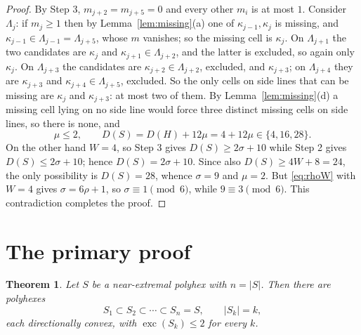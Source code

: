 \documentclass[11pt]{article}
\theoremstyle{plain}
\newtheorem{theorem}{Theorem}[section]
\theoremstyle{definition}
\theoremstyle{remark}
\DeclareMathOperator{\exc}{exc}
\begin{document}
\begin{proof}
By Step 3, \(m_{j+2}=m_{j+5}=0\) and every other \(m_{i}\) is at most \(1\). Consider
\(\Lambda_{j}\): if \(m_{j}\ge1\) then by Lemma~\ref{lem:missing}(a) one of
\(\kappa_{j-1},\kappa_{j}\) is missing, and \(\kappa_{j-1}\in\Lambda_{j-1}=\Lambda_{j+5}\),
whose \(m\) vanishes; so the missing cell is \(\kappa_{j}\). On \(\Lambda_{j+1}\) the two
candidates are \(\kappa_{j}\) and \(\kappa_{j+1}\in\Lambda_{j+2}\), and the latter is
excluded, so again only \(\kappa_{j}\). On \(\Lambda_{j+3}\) the candidates are
\(\kappa_{j+2}\in\Lambda_{j+2}\), excluded, and \(\kappa_{j+3}\); on \(\Lambda_{j+4}\) they
are \(\kappa_{j+3}\) and \(\kappa_{j+4}\in\Lambda_{j+5}\), excluded. So the only cells on
side lines that can be missing are \(\kappa_{j}\) and \(\kappa_{j+3}\): at most two of
them. By Lemma~\ref{lem:missing}(d) a missing cell lying on no side line would force three
distinct missing cells on side lines, so there is none, and
\[
   \mu\le2,\qquad D(S)=D(H)+12\mu=4+12\mu\in\{4,16,28\} .
\]
On the other hand \(W=4\), so Step 3 gives \(D(S)\ge2\sigma+10\) while Step 2 gives
\(D(S)\le2\sigma+10\); hence \(D(S)=2\sigma+10\). Since also \(D(S)\ge4W+8=24\), the only
possibility is \(D(S)=28\), whence \(\sigma=9\) and \(\mu=2\). But \eqref{eq:rhoW} with
\(W=4\) gives \(\sigma=6\rho+1\), so \(\sigma\equiv1\pmod 6\), while \(9\equiv3\pmod 6\).
This contradiction completes the proof.
\end{proof}

\section{The primary proof}\label{sec:primary}

\begin{theorem}\label{thm:near}
Let \(S\) be a near-extremal polyhex with \(n=|S|\). Then there are polyhexes
\[
   S_{1}\subset S_{2}\subset\cdots\subset S_{n}=S,\qquad |S_{k}|=k,
\]
each directionally convex, with \(\exc(S_{k})\le2\) for every \(k\).
\end{theorem}
\end{document}
